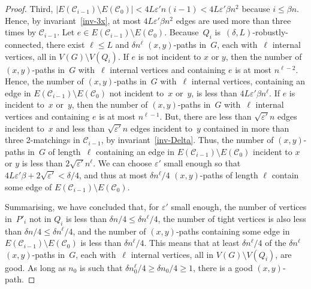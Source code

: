 \documentclass[a4paper, 11pt,reqno]{amsart}
\newcommand{\calC}{\mathcal{C}}
\theoremstyle{plain}
\theoremstyle{definition}
\numberwithin{equation}{section}
\newcommand{\eps}{\varepsilon}
\begin{document}
\begin{proof}
  Third, $|E(\calC_{i-1}) \setminus E(\calC_0)| < 4L\eps'n(i-1) < 4L\eps'\beta n^2$
  because $i \leq \beta n$.  Hence, by invariant~\ref{inv-3x}, at most 
  $4L\eps'\beta n^2$ edges are used more than three times by $\calC_{i-1}$.  
  Let $e \in E(\calC_{i-1}) \setminus E(\calC_0)$. 
  Because~$Q_i$ is~$(\delta,L)$-robustly-connected, there exist $\ell \leq L$ 
  and $\delta n^\ell$ $(x,y)$-paths in~$G$, each with~$\ell$ internal vertices, 
  all in $V(G) \setminus V(Q_i)$.
  If $e$ is not incident to $x$ or $y$, then the number of $(x,y)$-paths 
  in~$G$ with~$\ell$ internal vertices and containing $e$ is at most $n^{\ell-2}$. 
  Hence, the number of $(x,y)$-paths in~$G$ with~$\ell$ internal vertices, 
  containing an edge in $E(\calC_{i-1}) \setminus E(\calC_0)$ not incident 
  to~$x$ or~$y$, is less than $4L\eps'\beta n^\ell$. 
  If $e$ is incident to~$x$ or~$y$, then the number of $(x,y)$-paths in~$G$ 
  with~$\ell$ internal vertices and containing $e$ is at most $n^{\ell-1}$.
  But, there are less than $\sqrt{\eps'} n$ edges incident to~$x$ and less 
  than $\sqrt{\eps'} n$ edges incident to~$y$ contained in more than three 
  2-matchings in $\calC_{i-1}$, by invariant~\ref{inv-Delta}.  
  Thus, the number of $(x,y)$-paths in~$G$ of length~$\ell$ containing an edge 
  in $E(\calC_{i-1}) \setminus E(\calC_0)$ incident to $x$ or $y$ is less 
  than $2\sqrt{\eps'}n^\ell$.  We can choose $\eps'$ small enough so that 
  $4L\eps'\beta+2\sqrt{\eps'} < \delta/4$, and thus at most $\delta n^\ell/4$ 
  $(x,y)$-paths of length $\ell$ contain some edge of $E(\calC_{i-1}) \setminus E(\calC_0)$.
  
  Summarising, we have concluded that, for $\eps'$ small enough, the number of vertices 
  in~$P'_i$ not in $Q_i$ is less than $\delta n/4 \leq \delta n^\ell/4$, the number of 
  tight vertices is also less than $\delta n/4 \leq \delta n^\ell/4$, and the number 
  of $(x,y)$-paths containing some edge in~$E(\calC_{i-1}) \setminus E(\calC_0)$ 
  is less than $\delta n^\ell/4$.  This means that at least $\delta n^\ell/4$ of the 
  $\delta n^\ell$ $(x,y)$-paths in~$G$, each with~$\ell$ internal vertices, 
  all in $V(G) \setminus V(Q_i)$, are good.  As long as $n_0$ is such that 
  $\delta n_0^\ell/4 \geq \delta n_0 / 4 \geq 1$, there is a good $(x,y)$-path. 
  

\end{proof}
\end{document}
